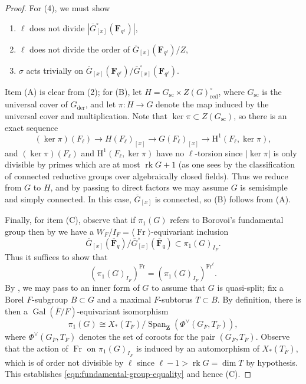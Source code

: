 \documentclass[reqno]{amsart}
\numberwithin{equation}{subsection}
\newcommand{\F}{\mathbf{F}}
\newcommand{\Z}{\mathbf{Z}}
\newcommand{\Gal}{\operatorname{Gal}}
\newcommand{\ol}[1]{\overline{#1}}
\newcommand{\co}{\colon}
\DeclareMathOperator{\Span}{Span}
\DeclareMathOperator{\red}{red}
\DeclareMathOperator{\der}{der}
\DeclareMathOperator{\rk}{rk}
\DeclareMathOperator{\Fr}{Fr}
\newcommand{\rH}{\ensuremath{\mathrm{H}}\xspace}
\theoremstyle{remark}
\numberwithin{equation}{subsection}
\numberwithin{figure}{subsection}
\begin{document}
\begin{proof}
    For (4), we must show
    \begin{enumerate}[label=(\Alph*)]
        \item $\ell$ does not divide $|\ol G_{[x]}^\circ(\F_{q^\ell})|$,
        \item $\ell$ does not divide the order of $\ol G_{[x]}(\F_{q^\ell})/Z$,
        \item $\sigma$ acts trivially on $\ol G_{[x]}(\F_{q^\ell})/\ol G_{[x]}^\circ(\F_{q^\ell})$.
    \end{enumerate}
    Item (A) is clear from (2); for (B), let $H = G_{\mathrm{sc}} \times Z(G)^\circ_{\red}$, where $G_{\mathrm{sc}}$ is the universal cover of $G_{\der}$, and let $\pi\co H \to G$ denote the map induced by the universal cover and multiplication. Note that $\ker \pi \subset Z(G_{\mathrm{sc}})$, so there is an exact sequence
    \[
    (\ker \pi)(F_\ell) \to H(F_\ell)_{[x]} \to G(F_\ell)_{[x]} \to \rH^1(F_\ell, \ker \pi),
    \]
    and $(\ker \pi)(F_\ell)$ and $\rH^1(F_\ell, \ker\pi)$ have no $\ell$-torsion since $|\ker \pi|$ is only divisible by primes which are at most $\rk G + 1$ (as one sees by the classification of connected reductive groups over algebraically closed fields). Thus we reduce from $G$ to $H$, and by passing to direct factors we may assume $G$ is semisimple and simply connected. In this case, $\ol G_{[x]}$ is connected, so (B) follows from (A).

    Finally, for item (C), observe that if $\pi_1(G)$ refers to Borovoi's fundamental group then by \cite[Corollary~11.6.3]{KP} we have a $W_F/I_F = \langle\Fr\rangle$-equivariant inclusion
    \[
    \ol G_{[x]}(\ol\F_q)/\ol G_{[x]}^\circ(\ol\F_q) \subset \pi_1(G)_{I_F}.
    \]
    Thus it suffices to show that
    \begin{equation}\label{eqn:fundamental-group-equality}
    (\pi_1(G)_{I_F})^{\Fr} = (\pi_1(G)_{I_F})^{\Fr^\ell}.
    \end{equation}
    By \cite[Lemma~1.8]{Bor98}, we may pass to an inner form of $G$ to assume that $G$ is quasi-split; fix a Borel $F$-subgroup $B \subset G$ and a maximal $F$-subtorus $T \subset B$. By definition, there is then a $\Gal(\ol F/F)$-equivariant isomorphism
    \[
    \pi_1(G) \cong X_*(T_{\ol F})/\Span_{\Z}(\Phi^\vee(G_{\ol F}, T_{\ol F})),
    \]
    where $\Phi^\vee(G_{\ol F}, T_{\ol F})$ denotes the set of coroots for the pair $(G_{\ol F}, T_{\ol F})$. Observe that the action of $\Fr$ on $\pi_1(G)_{I_F}$ is induced by an automorphism of $X_*(T_{\ol F})$, which is of order not divisible by $\ell$ since $\ell - 1 > \rk G = \dim T$ by hypothesis. This establishes \eqref{eqn:fundamental-group-equality} and hence (C).
\end{proof}
\end{document}

